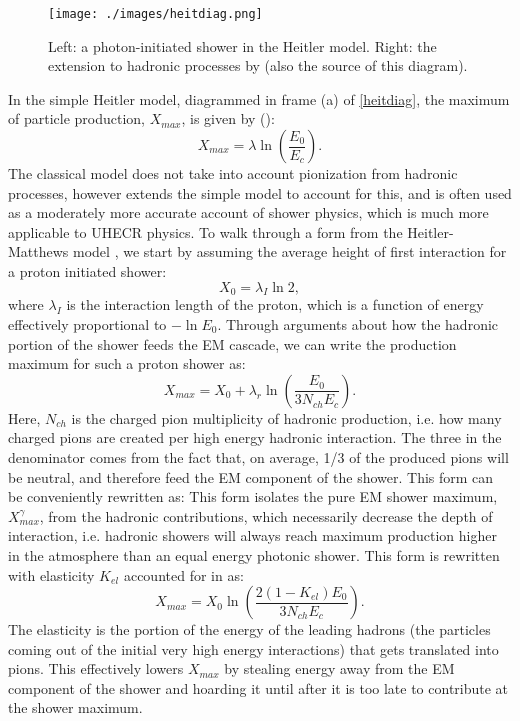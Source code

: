 \begin{figure}[h!]
\begin{center}
\texttt{[image: ./images/heitdiag.png]}
\caption[Heitler Model Diagram]{Left: a photon-initiated shower in the Heitler model. Right: the extension to hadronic processes by \textcite{matthews} (also the source of this diagram). }
\label{heitdiag}
\end{center}
\end{figure}

In the simple Heitler model, diagrammed in frame (a) of \autoref{heitdiag}, the maximum of particle production, $X_{max}$, is given by (\cite{stanev2}):
$$ X_{max}=\lambda \ln\left(\frac{E_0}{E_c}\right).$$
The classical model does not take into account pionization from hadronic processes, however \textcite{matthews} extends the simple model to account for this, and is often used as a moderately more accurate account of shower physics, which is much more applicable to UHECR physics. To walk through a form from the Heitler-Matthews model \cite{matthews}, we start by assuming the average height of first interaction for a proton initiated shower:
$$X_0=\lambda_I\ln{2},$$
where $\lambda_I$ is the interaction length of the proton, which is a function of energy effectively proportional to $-\ln E_0$. Through arguments about how the hadronic portion of the shower feeds the EM cascade, we can write the production maximum for such a proton shower as:
$$X_{max}=X_0+\lambda_r\ln\left(\frac{E_0}{3 N_{ch} E_c }\right).$$
Here, $N_{ch}$ is the charged pion multiplicity of hadronic production, i.e. how many charged pions are created per high energy hadronic interaction. The three in the denominator comes from the fact that, on average, 1/3 of the produced pions will be neutral, and therefore feed the EM component of the shower. This form can be conveniently rewritten as:
This form isolates the pure EM shower maximum, $X_{max}^\gamma$, from the hadronic contributions, which necessarily decrease the depth of interaction, i.e. hadronic showers will always reach maximum production higher in the atmosphere than an equal energy photonic shower. This form is rewritten with elasticity $K_{el}$ accounted for in \textcite{stanev2} as:
$$X_{max}= X_0 \ln\left(\frac{2(1-K_{el})E_0}{3 N_{ch} E_c}\right). $$
The elasticity is the portion of the energy of the leading hadrons (the particles coming out of the initial very high energy interactions) that gets translated into pions. This effectively lowers $X_{max}$ by stealing energy away from the EM component of the shower and hoarding it until after it is too late to contribute at the shower maximum.


